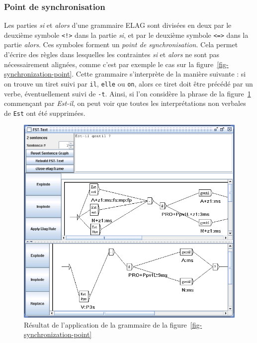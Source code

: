 \subsubsection{Point de synchronisation}
Les parties \textit{si} et \textit{alors} d’une grammaire ELAG sont divisées en deux par le
deuxième symbole \verb+<!>+ dans la partie  \textit{si}, et par le deuxième symbole \verb+<=>+
dans la partie \textit{alors}.
Ces symboles forment un \textit{point de synchronisation}.
Cela permet d’écrire des règles dans lesquelles les contraintes \textit{si} et \textit{alors} 
ne sont pas nécessairement alignées, comme c’est par exemple le
cas sur la figure~\ref{fig-synchronization-point}. Cette grammaire s’interprète de la manière 
suivante : si on trouve un tiret suivi par \verb+il+, \verb+elle+ ou \verb+on+, alors ce tiret
doit être précédé par un verbe, éventuellement suivi de \verb+-t+. Ainsi, si l’on considère
la phrase de la figure~\ref{fig-est-il} commençant par \textit{Est-il}, on peut voir que toutes
les interprétations non verbales de \verb+Est+ ont été supprimées.


\begin{figure}[!ht]
\begin{center}
\includegraphics[width=14cm]{resources/img/fig7-15.png}
\caption{Résultat de l’application de la grammaire de la figure~\ref{fig-synchronization-point}\label{fig-est-il}}
\end{center}
\end{figure}

